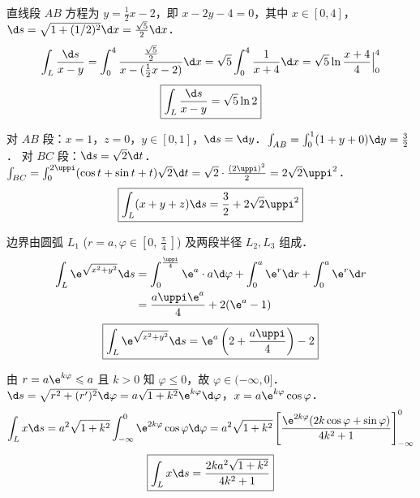\begin{solution}

    直线段 $AB$ 方程为 $y = \frac{1}{2}x - 2$，即 $x-2y-4=0$，其中 $x \in [0, 4]$，$\d s = \sqrt{1+(1/2)^{2}} \d x = \frac{\sqrt{5}}{2} \d x$．
    \begin{equation}
        \int_{L} \frac{\d s}{x-y} = \int_{0}^{4} \frac{\frac{\sqrt{5}}{2}}{x - (\frac{1}{2}x - 2)} \d x = \sqrt{5} \int_{0}^{4} \frac{1}{x+4} \d x = \sqrt{5} \ln \frac{x+4}{4} \Big|_{0}^{4}
    \end{equation}
    \begin{equation}
        \boxed{\int_{L} \frac{\d s}{x-y} = \sqrt{5} \ln 2}
    \end{equation}


    对 $AB$ 段：$x=1$，$z=0$，$y \in [0, 1]$，$\d s = \d y$．$\int_{AB} = \int_{0}^{1}(1+y+0) \d y = \frac{3}{2}$．
    对 $BC$ 段：$\d s = \sqrt{2} \d t$．$\int_{BC} = \int_{0}^{2 \uppi}(\cos t + \sin t + t) \sqrt{2} \d t = \sqrt{2} \cdot \frac{(2 \uppi)^{2}}{2} = 2 \sqrt{2} \uppi^{2}$．
    \begin{equation}
        \boxed{\int_{L}(x+y+z) \d s = \frac{3}{2} + 2 \sqrt{2} \uppi^{2}}
    \end{equation}


    边界由圆弧 $L_{1}$ ($r=a, \varphi \in [0, \frac{\uppi}{4}]$) 及两段半径 $L_{2}, L_{3}$ 组成．
    \begin{equation}
        \begin{aligned}
            \int_{L} \e^{\sqrt{x^{2}+y^{2}}} \d s & = \int_{0}^{\frac{\uppi}{4}} \e^{a} \cdot a \d \varphi + \int_{0}^{a} \e^{r} \d r + \int_{0}^{a} \e^{r} \d r \\
                                                  & = \frac{a \uppi \e^{a}}{4} + 2(\e^{a}-1)
        \end{aligned}
    \end{equation}
    \begin{equation}
        \boxed{\int_{L} \e^{\sqrt{x^{2}+y^{2}}} \d s = \e^{a}\left(2 + \frac{a \uppi}{4}\right) - 2}
    \end{equation}


    由 $r = a \e^{k \varphi} \leqslant a$ 且 $k>0$ 知 $\varphi \leqslant 0$，故 $\varphi \in (-\infty, 0]$．
    $\d s = \sqrt{r^{2} + (r')^{2}} \d \varphi = a \sqrt{1+k^{2}} \e^{k \varphi} \d \varphi$，$x = a \e^{k \varphi} \cos \varphi$．
    \begin{equation}
        \int_{L} x \d s = a^{2} \sqrt{1+k^{2}} \int_{-\infty}^{0} \e^{2k \varphi} \cos \varphi \d \varphi = a^{2} \sqrt{1+k^{2}} \left[ \frac{\e^{2k \varphi}(2k \cos \varphi + \sin \varphi)}{4k^{2}+1} \right]_{-\infty}^{0}
    \end{equation}
    \begin{equation}
        \boxed{\int_{L} x \d s = \frac{2 k a^{2} \sqrt{1+k^{2}}}{4 k^{2}+1}}
    \end{equation}


\end{solution}
